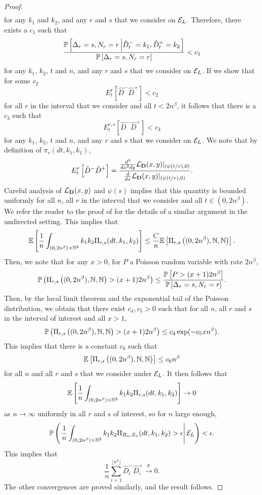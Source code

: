 \begin{proof}
\begin{align*}
\end{align*} for any $k_1$ and $k_2$, and any $r$ and $s$ that we consider on $\cE_L$. Therefore, there exists a $c_1$ such that
$$\frac{\P\left[ \Delta_r=s, N_r=r \left| \hat{D}^-_t=k_1,\hat{D}^+_t=k_2\right.\right]}{\P\left[ \Delta_r=s, N_r=r\right]}<c_1$$
for any $k_1$, $k_2$, $t$ and $n$, and any $r$ and $s$ that we consider on $\cE_L$. If we show that for some $c_2$ $${E}^r_t\left[\hat{D}^-\hat{D}^+\right]<c_2$$ for all $r$ in the interval that we consider and all $t<2n^\beta$, it follows that there is a $c_3$ such that
$${E}^{r,s}_t\left[\hat{D}^-\hat{D}^+\right]<c_3$$ 
for any $k_1$, $k_2$, $t$ and $n$, and any $r$ and $s$ that we consider on $\cE_L$.
We note that by definition of $\pi_r(dt,k_1,k_1)$, 
$${E}^r_t\left[\hat{D}^-\hat{D}^+\right]=\frac{\frac{d^3}{dx^2 dy}\cL_{\mathbf{D}}(x,y)|_{(\psi(t/r),0)}}{\frac{d}{dx}\cL_{\mathbf{D}}(x,y)|_{(\psi(t/r),0)}}.$$
Careful analysis of $\cL_{\mathbf{D}}(x,y)$ and $\psi(s)$ implies that this quantity is bounded uniformly for all $n$, all $r$ in the interval that we consider and all $t\in(0,2n^\beta)$. We refer the reader to the proof of   \cite[Lemma A.1]{josephComponentSizesCritical2014} for the details of a similar argument in the undirected setting.
This implies that 
$$\E\left[\frac{1}{n}\int_{(0,2n^\beta)\times \N^2}k_1k_2 \Pi_{r,s}(dt,k_1,k_2) \right]\leq \frac{C}{n}\E\left[\Pi_{r,s}\left((0,2n^\beta),\N,\N\right)\right].$$
Then, we note that for any $x>0$, for $P$ a Poisson random variable with rate $2n^\beta$,
$$\P\left(\Pi_{r,s}\left((0,2n^\beta),\N,\N\right)>(x+1)2n^\beta\right)\leq \frac{\P\left[P>(x+1)2n^\beta \right]}{\P\left[ \Delta_r=s, N_r=r\right]}.$$
Then, by the local limit theorem and the exponential tail of the Poisson distribution, we obtain that there exist $c_4,c_5>0$ such that for all $n$, all $r$ and $s$ in the interval of interest and all $x>1$,
$$\P\left(\Pi_{r,s}\left((0,2n^\beta),\N,\N\right)>(x+1)2n^\beta\right)\leq c_4\exp(-c_5xn^\beta).$$
This implies that there is a constant $c_6$ such that 
$$\E\left[\Pi_{r,s}\left((0,2n^\beta),\N,\N\right)\right]\leq c_6 n^\beta$$
for all $n$ and all $r$ and $s$ that we consider under $\cE_L$. 
It then follows that 
$$\E\left[\frac{1}{n}\int_{(0,2n^\beta)\times \N^2}k_1k_2 \Pi_{r,s}(dt,k_1,k_2) \right]\to 0$$
as $n\to \infty$ uniformly in all $r$ and $s$ of interest, so for $n$ large enough,
$$\P\left(\left.\frac{1}{n}\int_{(0,2n^\beta)\times \N^2}k_1k_2 \Pi_{R_n,S_n}(dt,k_1,k_2)>\epsilon  \right|\cE_L \right)<\epsilon.$$
This implies that
$$\frac{1}{n}\sum_{i=1}^{\lfloor n^\beta \rfloor}\hat{D}_i^- \hat{D}_i^+\overset{p}{\to}0.$$
The other convergences are proved similarly, and the result follows. 
\end{proof}
